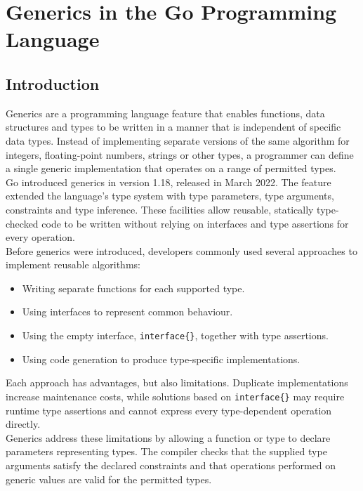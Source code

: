 \section{Generics in the Go Programming Language}

\subsection{Introduction}

Generics are a programming language feature that enables functions, data structures and types to be written in a manner that is independent of specific data types. Instead of implementing separate versions of the same algorithm for integers, floating-point numbers, strings or other types, a programmer can define a single generic implementation that operates on a range of permitted types.\\

Go introduced generics in version 1.18, released in March 2022. The feature extended the language's type system with type parameters, type arguments, constraints and type inference. These facilities allow reusable, statically type-checked code to be written without relying on interfaces and type assertions for every operation.\\

Before generics were introduced, developers commonly used several approaches to implement reusable algorithms:

\begin{itemize}
    \item Writing separate functions for each supported type.
    \item Using interfaces to represent common behaviour.
    \item Using the empty interface, \texttt{interface\{\}}, together with type assertions.
    \item Using code generation to produce type-specific implementations.
\end{itemize}

Each approach has advantages, but also limitations. Duplicate implementations increase maintenance costs, while solutions based on \texttt{interface\{\}} may require runtime type assertions and cannot express every type-dependent operation directly.\\

Generics address these limitations by allowing a function or type to declare parameters representing types. The compiler checks that the supplied type arguments satisfy the declared constraints and that operations performed on generic values are valid for the permitted types.\\

